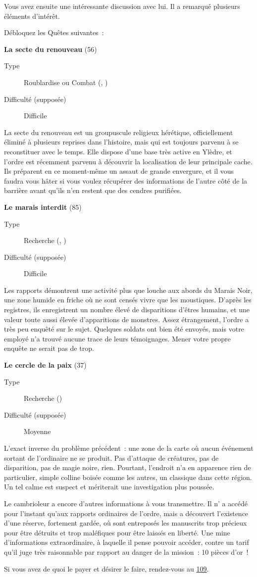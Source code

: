 \documentclass{report}
\newcommand{\glink}[1]{\hyperref[section-#1]{#1}}
\newcommand{\quest}[5]{
    \begin{mdframed}[innertopmargin=0.5cm,innerbottommargin=0.5cm]
        \begin{center}
            \textbf{#1} (#2)
        \end{center}
        \begin{description}
            \item[Type] #3
            \item[Difficulté (supposée)] #4
        \end{description}
        #5
    \end{mdframed}
}
\begin{document}
Vous avez ensuite une intéressante discussion avec lui. Il a remarqué plusieurs éléments d'intérêt.

Débloquez les Quêtes suivantes :

\quest{La secte du renouveau}{56}{Roublardise ou Combat (\ankh, \cross)}{Difficile}{
La secte du renouveau est un groupuscule religieux hérétique, officiellement éliminé à plusieurs reprises dans l'histoire, mais qui est toujours parvenu à se reconstituer avec le temps. Elle dispose d'une base très active en Ylèdre, et l'ordre est récemment parvenu à découvrir la localisation de leur principale cache. Ils préparent en ce moment-même un assaut de grande envergure, et il vous faudra vous hâter si vous voulez récupérer des informations de l'autre côté de la barrière avant qu'ils n'en restent que des cendres purifiées.
}

\quest{Le marais interdit}{85}{Recherche (\ankh, \caduceus)}{Difficile}{
Les rapports démontrent une activité plus que louche aux abords du Marais Noir, une zone humide en friche où ne sont censés vivre que les moustiques. D'après les registres, ils enregistrent un nombre élevé de disparitions d'êtres humains, et une valeur toute aussi élevée d'apparitions de monstres. Assez étrangement, l'ordre a très peu enquêté sur le sujet. Quelques soldats ont bien été envoyés, mais votre employé n'a trouvé aucune trace de leurs témoignages. Mener votre propre enquête ne serait pas de trop.
}

\clearpage

\quest{Le cercle de la paix}{37}{Recherche (\caduceus)}{Moyenne}{
L'exact inverse du problème précédent : une zone de la carte où aucun événement sortant de l'ordinaire ne se produit. Pas d'attaque de créatures, pas de disparition, pas de magie noire, rien. Pourtant, l'endroit n'a en apparence rien de particulier, simple colline boisée comme les autres, un classique dans cette région. Un tel calme est suspect et mériterait une investigation plus poussée.
}

Le cambrioleur a encore d'autres informations à vous transmettre. Il n' a accédé pour l'instant qu'aux rapports ordinaires de l'ordre, mais a découvert l'existence d'une réserve, fortement gardée, où sont entreposés les manuscrits trop précieux pour être détruits et trop maléfiques pour être laissés en liberté. Une mine d'informations extraordinaire, à laquelle il pense pouvoir accéder, contre un tarif qu'il juge très raisonnable par rapport au danger de la mission : 10 pièces d'or !

Si vous avez de quoi le payer et désirer le faire, rendez-vous au \glink{109}.
\end{document}
